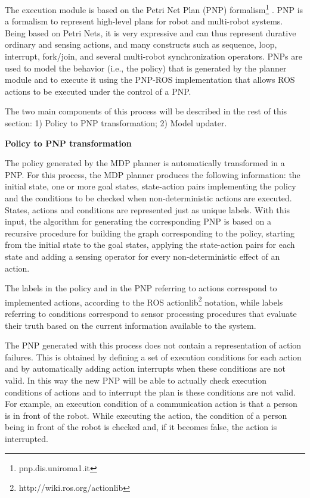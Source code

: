 The execution module is based on the Petri Net Plan (PNP) formalism\footnote{pnp.dis.uniroma1.it} \cite{ZiIo11PNP}. 
PNP is a formalism to represent high-level plans for robot and multi-robot systems. Being based on Petri Nets, it is very expressive and can thus represent durative ordinary and sensing actions, and many constructs such as sequence, loop, interrupt, fork/join, and several multi-robot synchronization operators.
PNPs are used to model the behavior (i.e., the policy) that is generated by the planner module and to execute it using the PNP-ROS implementation that allows ROS actions to be executed under the control of a PNP.


The two main components of this process will be described in the rest of this section:
1) Policy to PNP transformation; 2) Model updater.

\vspace{1em}
\noindent
{\bf Policy to PNP transformation}

The policy generated by the MDP planner is automatically transformed in a PNP.
For this process, the MDP planner produces the following information: the initial state,
one or more goal states, state-action pairs implementing the policy and the conditions to
be checked when non-deterministic actions are executed. 
States, actions and conditions are represented just as unique labels.
With this input, the algorithm for generating the corresponding PNP is based on a recursive procedure for building the graph corresponding to the policy, starting from the initial state to the goal states, applying the state-action pairs for each state and adding a sensing operator for every non-deterministic effect of an action.

The labels in the policy and in the PNP referring to actions correspond to implemented actions, according to the ROS actionlib\footnote{http://wiki.ros.org/actionlib} notation,
while labels referring to conditions correspond to sensor processing procedures that
evaluate their truth based on the current information available to the system.

The PNP generated with this process does not contain a representation of action failures.
This is obtained by defining a set of execution conditions for each action and by automatically adding action interrupts when these conditions are not valid. In this way the new PNP will be able to actually check execution conditions of actions and to interrupt the plan is these conditions are not valid. For example, an execution condition of a communication action is that a person is in front of the robot. While executing the action, the condition of a person being in front of the robot is checked and, if it becomes false, the action is interrupted.

